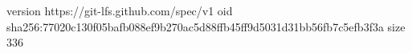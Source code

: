 version https://git-lfs.github.com/spec/v1
oid sha256:77020c130f05bafb088ef9b270ac5d88ffb45ff9d5031d31bb56fb7c5efb3f3a
size 336
